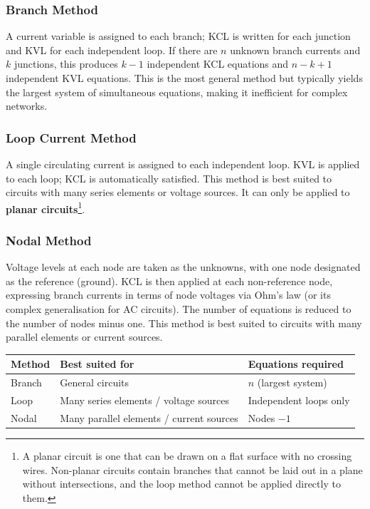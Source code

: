 \documentclass{article}
\begin{document}
\subsubsection{Branch Method}
A current variable is assigned to each branch; KCL is written for each junction and KVL for each independent loop. If there are $n$ unknown branch currents and $k$ junctions, this produces $k - 1$ independent KCL equations and $n - k + 1$ independent KVL equations. This is the most general method but typically yields the largest system of simultaneous equations, making it inefficient for complex networks.

\subsubsection{Loop Current Method}
A single circulating current is assigned to each independent loop. KVL is applied to each loop; KCL is automatically satisfied. This method is best suited to circuits with many series elements or voltage sources. It can only be applied to \textbf{planar circuits}\footnote{A planar circuit is one that can be drawn on a flat surface with no crossing wires. Non-planar circuits contain branches that cannot be laid out in a plane without intersections, and the loop method cannot be applied directly to them.}.

\subsubsection{Nodal Method}
Voltage levels at each node are taken as the unknowns, with one node designated as the reference (ground). KCL is then applied at each non-reference node, expressing branch currents in terms of node voltages via Ohm's law (or its complex generalisation for AC circuits). The number of equations is reduced to the number of nodes minus one. This method is best suited to circuits with many parallel elements or current sources.

\begin{center}
    \begin{tabular}{|l|l|l|}
    \hline
    Method & Best suited for & Equations required \\
    \hline
    Branch    & General circuits & $n$ (largest system) \\
    Loop      & Many series elements / voltage sources & Independent loops only \\
    Nodal     & Many parallel elements / current sources & Nodes $- 1$ \\
    \hline
    \end{tabular}
\end{center}
\end{document}
